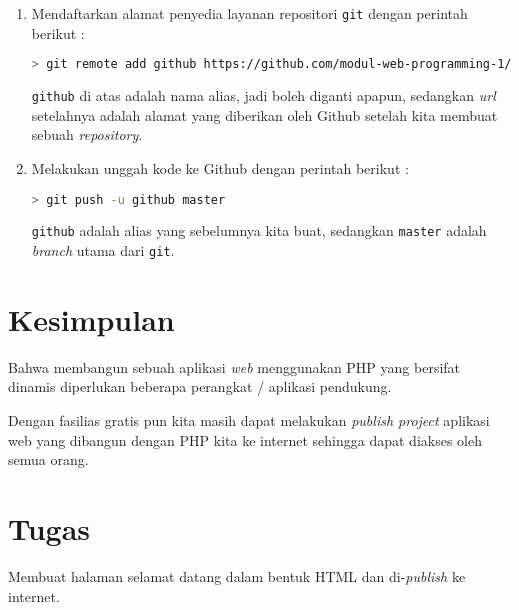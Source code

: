 \begin{enumerate}
	\item Mendaftarkan alamat penyedia layanan repositori \texttt{git} dengan perintah berikut :
	
	\begin{lstlisting}[language=bash]
> git remote add github https://github.com/modul-web-programming-1/praktek-001.git \end{lstlisting}

	\texttt{github} di atas adalah nama alias, jadi boleh diganti apapun, sedangkan \textit{url} setelahnya adalah alamat yang diberikan oleh Github setelah kita membuat sebuah \textit{repository}.

	\item Melakukan unggah kode ke Github dengan perintah berikut :
	
	\begin{lstlisting}[language=bash]
> git push -u github master		\end{lstlisting}

	\texttt{github} adalah alias yang sebelumnya kita buat, sedangkan \texttt{master} adalah \textit{branch} utama dari \texttt{git}.
	
\end{enumerate}

\section{Kesimpulan}

Bahwa membangun sebuah aplikasi \textit{web} menggunakan PHP yang bersifat dinamis diperlukan beberapa perangkat / aplikasi pendukung.

Dengan fasilias gratis pun kita masih dapat melakukan \textit{publish project} aplikasi web yang dibangun dengan PHP kita ke internet sehingga dapat diakses oleh semua orang.

\section{Tugas}

Membuat halaman selamat datang dalam bentuk HTML dan di-\textit{publish} ke internet.